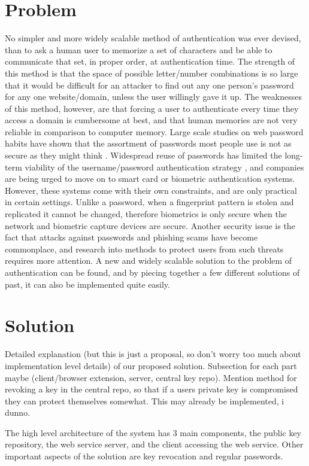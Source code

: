 \documentclass[11pt]{article}   %
\begin{document}
\section{Problem} \label{sec:prob}
No simpler and more widely scalable method of authentication was ever devised, than to ask a human user to memorize a set of characters and be able to communicate that set, in proper order, at authentication time.  The strength of this method is that the space of possible letter/number combinations is so large that it would be difficult for an attacker to find out any one person's password for any one website/domain, unless the user willingly gave it up.  The weaknesses of this method, however, are that forcing a user to authenticate every time they access a domain is cumbersome at best, and that human memories are not very reliable in comparison to computer memory.  Large scale studies on web password habits have shown that the assortment of passwords most people use is not as secure as they might think \cite{habits}.  Widespread reuse of passwords has limited the long-term viability of the username/password authentication strategy \cite{domino}, and companies are being urged to move on to smart card or biometric authentication systems.  However, these systems come with their own constraints, and are only practical in certain settings. Unlike a password, when a fingerprint pattern is stolen and replicated it cannot be changed, therefore biometrics is only secure when the network and biometric capture devices are secure.  Another security issue is the fact that attacks against passwords and phishing scams have become commonplace, and research into methods to protect users from such threats requires more attention.  A new and widely scalable solution to the problem of authentication can be found, and by piecing together a few different solutions of past, it can also be implemented quite easily.

\section{Solution} \label{sec:sol}
Detailed explanation (but this is just a proposal, so don't worry too much about implementation level details) of our proposed solution. Subsection for each part maybe (client/browser extension, server, central key repo).
Mention method for revoking a key in the central repo, so that if a users private key is compromised they can protect themselves somewhat. This may already be implemented, i dunno.

The high level architecture of the system has 3 main components, the public key repository, the web service server, and the client accessing the web service. Other important aspects of the solution are key revocation and regular passwords. \\
\end{document}
